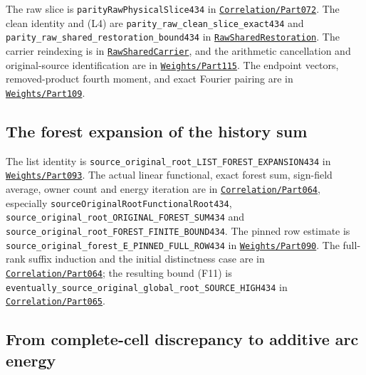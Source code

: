 The raw slice is {\small\nolinkurl{parityRawPhysicalSlice434}} in
\href{../Green64/Library/Correlation/Part072.lean}{\nolinkurl{Correlation/Part072}}.
The clean identity and (L4) are
{\small\nolinkurl{parity_raw_clean_slice_exact434}} and
{\small\nolinkurl{parity_raw_shared_restoration_bound434}} in
\href{../Green64/Library/Weights/RawSharedRestoration.lean}{\nolinkurl{RawSharedRestoration}}.
The carrier reindexing is in
\href{../Green64/Library/Weights/RawSharedCarrier.lean}{\nolinkurl{RawSharedCarrier}},
and the arithmetic cancellation and original-source identification are
in
\href{../Green64/Library/Weights/Part115.lean}{\nolinkurl{Weights/Part115}}.
The endpoint vectors, removed-product fourth moment, and exact Fourier
pairing are in
\href{../Green64/Library/Weights/Part109.lean}{\nolinkurl{Weights/Part109}}.


\hypertarget{forest-moments-source-correspondence}{%
\subsection{The forest expansion of the history
sum}\label{forest-moments-source-correspondence}}

The list identity is
{\small\nolinkurl{source_original_root_LIST_FOREST_EXPANSION434}} in
\href{../Green64/Library/Weights/Part093.lean}{\nolinkurl{Weights/Part093}}.
The actual linear functional, exact forest sum, sign-field average,
owner count and energy iteration are in
\href{../Green64/Library/Correlation/Part064.lean}{\nolinkurl{Correlation/Part064}},
especially {\small\nolinkurl{sourceOriginalRootFunctionalRoot434}},
{\small\nolinkurl{source_original_root_ORIGINAL_FOREST_SUM434}} and
{\small\nolinkurl{source_original_root_FOREST_FINITE_BOUND434}}. The
pinned row estimate is
{\small\nolinkurl{source_original_forest_E_PINNED_FULL_ROW434}} in
\href{../Green64/Library/Weights/Part090.lean}{\nolinkurl{Weights/Part090}}.
The full-rank suffix induction and the initial distinctness case are in
\href{../Green64/Library/Correlation/Part064.lean}{\nolinkurl{Correlation/Part064}};
the resulting bound (F11) is
{\small\nolinkurl{eventually_source_original_global_root_SOURCE_HIGH434}}
in
\href{../Green64/Library/Correlation/Part065.lean}{\nolinkurl{Correlation/Part065}}.


\hypertarget{local-energy-source-correspondence}{%
\subsection{From complete-cell discrepancy to additive arc
energy}\label{local-energy-source-correspondence}}


